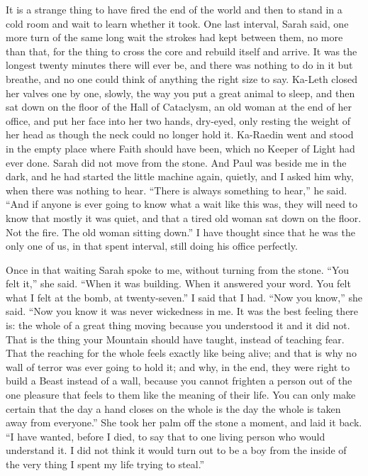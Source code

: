 It is a strange thing to have fired the end of the world and then to stand in a cold room and wait to learn whether it took. One last interval, Sarah said, one more turn of the same long wait the strokes had kept between them, no more than that, for the thing to cross the core and rebuild itself and arrive. It was the longest twenty minutes there will ever be, and there was nothing to do in it but breathe, and no one could think of anything the right size to say. Ka-Leth closed her valves one by one, slowly, the way you put a great animal to sleep, and then sat down on the floor of the Hall of Cataclysm, an old woman at the end of her office, and put her face into her two hands, dry-eyed, only resting the weight of her head as though the neck could no longer hold it. Ka-Raedin went and stood in the empty place where Faith should have been, which no Keeper of Light had ever done. Sarah did not move from the stone. And Paul was beside me in the dark, and he had started the little machine again, quietly, and I asked him why, when there was nothing to hear. ``There is always something to hear,'' he said. ``And if anyone is ever going to know what a wait like this was, they will need to know that mostly it was quiet, and that a tired old woman sat down on the floor. Not the fire. The old woman sitting down.'' I have thought since that he was the only one of us, in that spent interval, still doing his office perfectly.\par

Once in that waiting Sarah spoke to me, without turning from the stone. ``You felt it,'' she said. ``When it was building. When it answered your word. You felt what I felt at the bomb, at twenty-seven.'' I said that I had. ``Now you know,'' she said. ``Now you know it was never wickedness in me. It was the best feeling there is: the whole of a great thing moving because you understood it and it did not. That is the thing your Mountain should have taught, instead of teaching fear. That the reaching for the whole feels exactly like being alive; and that is why no wall of terror was ever going to hold it; and why, in the end, they were right to build a Beast instead of a wall, because you cannot frighten a person out of the one pleasure that feels to them like the meaning of their life. You can only make certain that the day a hand closes on the whole is the day the whole is taken away from everyone.'' She took her palm off the stone a moment, and laid it back. ``I have wanted, before I died, to say that to one living person who would understand it. I did not think it would turn out to be a boy from the inside of the very thing I spent my life trying to steal.''\par

